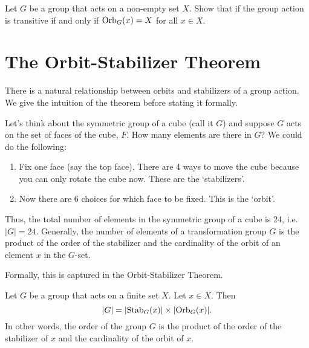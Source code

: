 \begin{exercise}\label{exercise-group-action-transitive-iff-all-orbits-is-whole-set}
    Let $G$ be a group that acts on a non-empty set $X$. Show that if the group action is transitive if and only if $\mathrm{Orb}_{G}(x) = X$ for all $x \in X$.
\end{exercise}

\section{The Orbit-Stabilizer Theorem}
There is a natural relationship between orbits and stabilizers of a group action. We give the intuition of the theorem before stating it formally.

Let's think about the symmetric group of a cube (call it $G$) and suppose $G$ acts on the set of faces of the cube, $F$. How many elements are there in $G$? We could do the following:
\begin{enumerate}
    \item Fix one face (say the top face). There are 4 ways to move the cube because you can only rotate the cube now. These are the `stabilizers'.
    \item Now there are 6 choices for which face to be fixed. This is the `orbit'.
\end{enumerate}
Thus, the total number of elements in the symmetric group of a cube is 24, i.e. $|G| = 24$. Generally, the number of elements of a transformation group $G$ is the product of the order of the stabilizer and the cardinality of the orbit of an element $x$ in the $G$-set.

\newpage

Formally, this is captured in the Orbit-Stabilizer Theorem.
\begin{theorem}\label{thrm-orbit-stabilizer}
    Let $G$ be a group that acts on a finite set $X$. Let $x \in X$. Then
    \[
        |G| = |\mathrm{Stab}_{G}(x)| \times |\mathrm{Orb}_{G}(x)|.
    \]
    In other words, the order of the group $G$ is the product of the order of the stabilizer of $x$ and the cardinality of the orbit of $x$.
\end{theorem}

